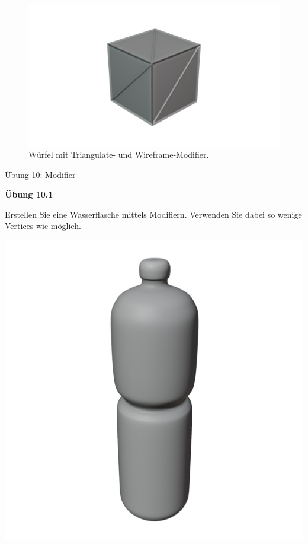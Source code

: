 \documentclass[
]{book}
\begin{document}
\begin{figure}

\includegraphics{Chapters/Images/Chapter_14/14_29_Example_Triangulated Wireframe.png}

\caption{\label{fig-1_29}Würfel mit Triangulate- und
Wireframe-Modifier.}

\end{figure}%

Übung 10: Modifier

\textbf{Übung 10.1}

Erstellen Sie eine Wasserflasche mittels Modifiern. Verwenden Sie dabei
so wenige Vertices wie möglich.

\includegraphics{Chapters/Images/Chapter_14/Exercise_10_1.png}\hfill
\end{document}
